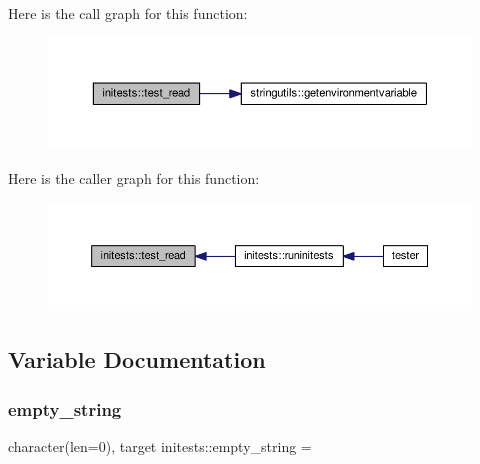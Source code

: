 Here is the call graph for this function\+:
\nopagebreak
\begin{figure}[H]
\begin{center}
\leavevmode
\includegraphics[width=350pt]{namespaceinitests_a0b26dd9f51d814267992b7a0b9bac310_cgraph}
\end{center}
\end{figure}
Here is the caller graph for this function\+:
\nopagebreak
\begin{figure}[H]
\begin{center}
\leavevmode
\includegraphics[width=350pt]{namespaceinitests_a0b26dd9f51d814267992b7a0b9bac310_icgraph}
\end{center}
\end{figure}


\subsection{Variable Documentation}
\mbox{\label{namespaceinitests_a7c03c5dbd9ffd94ba170d586d799f467}} 
\subsubsection{\texorpdfstring{empty\+\_\+string}{empty\_string}}
{\footnotesize\ttfamily character(len=0), target initests\+::empty\+\_\+string = \textquotesingle{}\textquotesingle{}}

